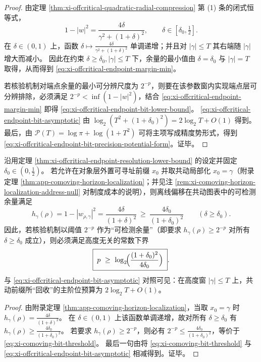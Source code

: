 \begin{proof}
由定理 \ref{thm:xi-offcritical-quadratic-radial-compression} 第 (1) 条的闭式恒等式，
\[
1-|w|^2=\frac{4\delta}{\gamma^2+(1+\delta)^2},
\qquad \delta\in[\delta_0,\tfrac12].
\]
在 \(\delta\in(0,1)\) 上，函数 \(\delta\mapsto \frac{4\delta}{\gamma^2+(1+\delta)^2}\) 单调递增；并且对 \(|\gamma|\le T\) 其右端随 \(|\gamma|\) 增大而减小。
因此在约束 \(\delta\ge\delta_0,|\gamma|\le T\) 下，余量的最小值由 \(\delta=\delta_0\) 与 \(|\gamma|=T\) 取得，从而得到 \eqref{eq:xi-offcritical-endpoint-margin-min}。
\par
若核验机制对端点余量的最小可分辨尺度为 \(2^{-p}\)，则要在该参数窗内实现端点层可分辨排除，必须满足 \(2^{-p}<\inf(1-|w|^2)\)，结合 \eqref{eq:xi-offcritical-endpoint-margin-min} 即得 \eqref{eq:xi-offcritical-endpoint-bit-lower-bound}。
\eqref{eq:xi-offcritical-endpoint-bit-asymptotic} 由 \(\log_2(T^2+(1+\delta_0)^2)=2\log_2 T+O(1)\) 得到。
最后，由 \(\mathcal{P}(T)=\log\pi+\log(1+T^2)\) 可将主项写成精度势形式，得到 \eqref{eq:xi-offcritical-endpoint-bit-precision-potential-form}。证毕。
\end{proof}

\begin{corollary}[共动前缀的位预算收益律：二次压缩 \texorpdfstring{$\Rightarrow$}{=>} 常数预算]\label{cor:xi-comoving-prefix-bit-budget-gain}
沿用定理 \ref{thm:xi-offcritical-endpoint-resolution-lower-bound} 的设定并固定 \(\delta_0\in(0,\tfrac12)\)。
若允许在对象层外置可寻址前缀 \(x_0\) 并取共动局部化 \(x_0=\gamma\)（附录定理 \ref{thm:app-comoving-horizon-localization}；并见注 \ref{rem:xi-comoving-horizon-localization-address-null} 对制度成本的说明），则离线偏移在共动图表中的可检测余量满足
\[
h_{\gamma}(\rho)=1-|w_{\rho,\gamma}|^2=\frac{4\delta}{(1+\delta)^2}\ \ge\ \frac{4\delta_0}{(1+\delta_0)^2}\qquad(\delta\ge\delta_0).
\]
因此，若核验机制以阈值 \(2^{-p}\) 作为“可检测余量”（即要求 \(h_{\gamma}(\rho)\ge 2^{-p}\) 对所有 \(\delta\ge\delta_0\) 成立），则必须满足高度无关的常数下界
\begin{equation}\label{eq:xi-comoving-bit-threshold}
\boxed{\;
p\ \ge\ \log_2\!\Bigl(\frac{(1+\delta_0)^2}{4\delta_0}\Bigr)\; }.
\end{equation}
与 \eqref{eq:xi-offcritical-endpoint-bit-asymptotic} 对照可见：在高度窗 \(|\gamma|\le T\) 上，共动前缀所“回收”的主阶位预算为 \(2\log_2T+O(1)\)。
\end{corollary}

\begin{proof}
由附录定理 \ref{thm:app-comoving-horizon-localization}，当取 \(x_0=\gamma\) 时
\(
h_{\gamma}(\rho)=\frac{4\delta}{(1+\delta)^2}
\)。
在 \(\delta\in(0,1)\) 上该函数单调递增，故对所有 \(\delta\ge\delta_0\) 有
\(
h_{\gamma}(\rho)\ge \frac{4\delta_0}{(1+\delta_0)^2}
\)。
若要求 \(h_{\gamma}(\rho)\ge 2^{-p}\)，则必有 \(2^{-p}\le \frac{4\delta_0}{(1+\delta_0)^2}\)，等价于 \eqref{eq:xi-comoving-bit-threshold}。
最后一句由将 \eqref{eq:xi-comoving-bit-threshold} 与 \eqref{eq:xi-offcritical-endpoint-bit-asymptotic} 相减得到。证毕。
\end{proof}

\endinput
